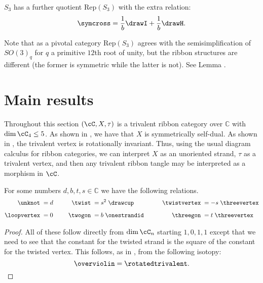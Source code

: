 \documentclass[12pt]{amsart}
\begin{document}
\begin{definition}
$S_{3}$ has a further quotient $\mathrm{Rep}(S_3)$ with the extra relation:
$$\symcross = \frac{1}{b}\drawI + \frac{1}{b}\drawH.$$
\end{definition}

Note that as a pivotal category $\mathrm{Rep}(S_3)$ agrees with the semisimplification of $SO(3)_q$ for $q$ a primitive $12$th root of unity, but the ribbon structures are different (the former is symmetric while the latter is not).  See Lemma .






\section{Main results}

Throughout this section $(\cC, X, \tau)$ is a trivalent ribbon category over
$\mathbb{C}$ with $\dim{\cC_4} \leq 5$.  As shown in \cite[Lemma
2.2]{MR3624901}, we have that $X$ is symmetrically self-dual.  As shown in
\cite[Lemma 8.2]{MR3624901}, the trivalent vertex is rotationally invariant.
Thus, using the usual diagram calculus for ribbon categories, we can interpret
$X$ as an unoriented strand, $\tau$ as a trivalent vertex, and then any
trivalent ribbon tangle may be interpreted as a morphism in $\cC$.

\begin{lemma} \label{lem:constants}
  For some numbers $d, b, t, s \in \mathbb{C}$ we have the following relations.
  \begin{equation}
    \label{eq:simple-rels}
  \begin{aligned}
    \unknot\; &= d&\qquad
      \twist\; &= s^2\;\drawcup&\qquad
        \twistvertex\; &= -s\;\threevertex\\[5pt]
    \loopvertex\;&=0&
      \twogon\;&= b\;\onestrandid&
        \threegon\; &= t\;\threevertex
  \end{aligned}
  \end{equation}
\end{lemma}

\begin{proof}
All of these follow directly from $\dim \cC_n$ starting $1,0,1,1$ except that
we need to see that the constant for the twisted strand is the square of the
constant for the twisted vertex.  This follows, as in
\cite[Lemma~8.2]{MR3624901}, from the following isotopy:
\begin{equation*}
\overviolin = \rotatedtrivalent. \qedhere
\end{equation*}
\end{proof}
\end{document}
